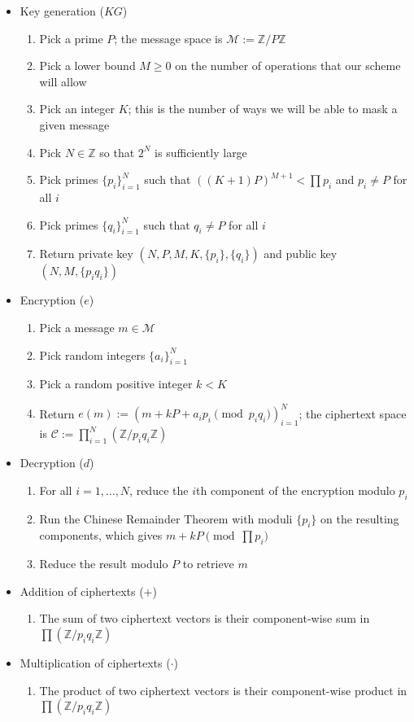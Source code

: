 \documentclass[11pt]{report}
\newcommand{\Z}{\mathbb{Z}}
\newcommand{\M}{\mathcal{M}}
\newcommand{\ZP}{\mathbb{Z}/P\mathbb{Z}}
\begin{document}
\begin{itemize}
\item Key generation ($KG$)
\begin{enumerate}
\item Pick a prime $P$; the message space is $\M := \ZP$
\item Pick a lower bound $M\geq 0$ on the number of operations that our scheme will allow
\item Pick an integer $K$; this is the number of ways we will be able to mask a given message
\item Pick $N\in \Z$ so that $2^N$ is sufficiently large
\item Pick primes $\{p_i\}_{i=1}^N$ such that $((K+1)P)^{M+1}<\prod p_i$ and $p_i\neq P$ for all $i$
\item Pick primes $\{q_i\}_{i=1}^N$ such that $q_i\neq P$ for all $i$
\item Return private key $(N,P,M,K,\{p_i\},\{q_i\})$ and public key $(N,M,\{p_iq_i\})$
\end{enumerate}

\item Encryption ($e$)
\begin{enumerate}
\item Pick a message $m\in \M$
\item Pick random integers $\{a_i\}_{i=1}^N$
\item Pick a random positive integer $k<K$
\item Return $e(m):=(m+kP+a_ip_i \pmod{p_iq_i})_{i=1}^N$; the ciphertext space is $\mathcal{C} := \prod_{i=1}^N(\Z/p_iq_i\Z)$
\end{enumerate}

\item Decryption ($d$)
\begin{enumerate}
\item For all $i=1,\ldots,N$, reduce the $i$th component of the encryption modulo $p_i$
\item Run the Chinese Remainder Theorem with moduli $\{p_i\}$ on the resulting components, which gives $m+kP \pmod{\prod p_i}$
\item Reduce the result modulo $P$ to retrieve $m$
\end{enumerate}

\item Addition of ciphertexts ($+$)
\begin{enumerate}
\item The sum of two ciphertext vectors is their component-wise sum in $\prod (\Z/p_iq_i\Z)$
\end{enumerate}

\item Multiplication of ciphertexts ($\cdot$)
\begin{enumerate}
\item The product of two ciphertext vectors is their component-wise product in $\prod(\Z/p_iq_i\Z)$
\end{enumerate}
\end{itemize}
\end{document}
